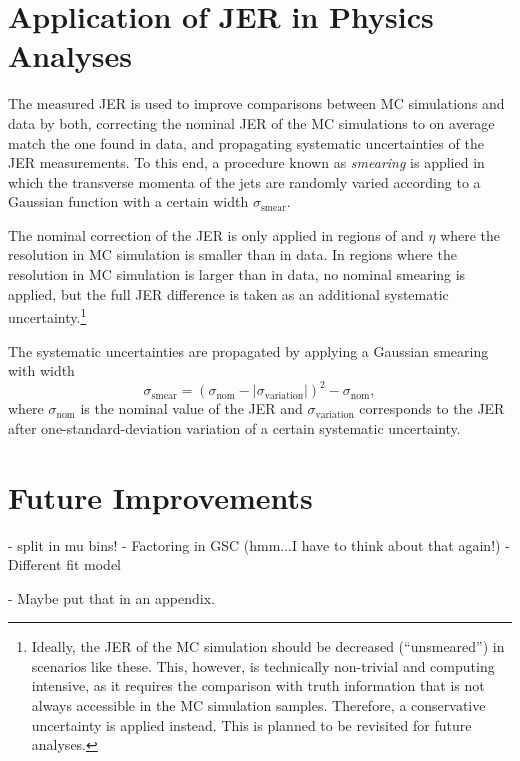 \section{Application of JER in Physics Analyses}
The measured JER is used to improve comparisons between MC simulations and data by both, correcting the nominal JER of the MC simulations to on average match the one found in data, and propagating systematic uncertainties of the JER measurements. 
To this end, a procedure known as \emph{smearing} is applied in which the transverse momenta of the jets are randomly varied according to a Gaussian function with a certain width $\sigma_{\text{smear}}$. 

The nominal correction of the JER is only applied in regions of \pT and $\eta$ where the resolution in MC simulation is smaller than in data. In regions where the resolution in MC simulation is larger than in data, no nominal smearing is applied, but the full JER difference is taken as an additional systematic uncertainty.\footnote{Ideally, the JER of the MC simulation should be decreased (``unsmeared'') in scenarios like these. This, however, is technically non-trivial and computing intensive, as it requires the comparison with truth information that is not always accessible in the MC simulation samples. Therefore, a conservative uncertainty is applied instead. This is planned to be revisited for future analyses.}

The systematic uncertainties are propagated by applying a Gaussian smearing with width
\begin{equation}
    \sigma_{\text{smear}} =  \left( \sigma_{\text{nom}} - |\sigma_{\text{variation}}|   \right)^2  - \sigma_{\text{nom}},
\end{equation}
where $\sigma_{\text{nom}}$ is the nominal value of the JER and $\sigma_{\text{variation}}$ corresponds to the JER after one-standard-deviation variation of a certain systematic uncertainty.





\section{Future Improvements}

- split in mu bins!
- Factoring in GSC (hmm...I have to think about that again!)
- Different fit model

- Maybe put that in an appendix.